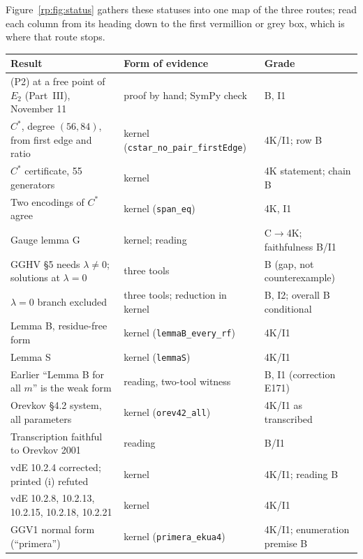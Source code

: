 \documentclass[a4paper,11pt]{article}
\newcommand{\sttag}[3]{{\setlength{\fboxsep}{1.2pt}\colorbox{#1}{\textcolor{#2}{\footnotesize #3}}}}
\newcommand{\stproved}[1]{\sttag{truebg}{truetext}{#1}}
\let\jsOldToprule\toprule
\renewcommand{\toprule}{\jsOldToprule\rowcolor{bgheader}}
\theoremstyle{jsplain}
\theoremstyle{jsdef}
\theoremstyle{jsrem}
\begin{document}
Figure~\ref{rp:fig:status} gathers these statuses into one map of the three routes; read each column from its heading down to the first vermillion or grey box, which is where that route stops.


\begin{center}
\label{rp:tab:status}%
\small
\begin{tabular}{@{}>{\raggedright\arraybackslash}p{5.6cm}>{\raggedright\arraybackslash}p{5.2cm}>{\raggedright\arraybackslash}p{3.2cm}@{}}
\toprule
Result & Form of evidence & Grade\\
\midrule
(P2) at a free point of $E_2$ (Part~III), November 11 & proof by hand; SymPy check & B, I1\\
$C^*$, degree $(56,84)$, from first edge and ratio & kernel (\texttt{cstar\_\allowbreak{}no\_\allowbreak{}pair\_\allowbreak{}firstEdge}) & \stproved{4K/I1}; row B\\
$C^*$ certificate, 55 generators & kernel & 4K statement; chain B\\
Two encodings of $C^*$ agree & kernel (\texttt{span\_\allowbreak{}eq}) & \stproved{4K, I1}\\
Gauge lemma G & kernel; reading & C$\to$4K; faithfulness B/I1\\
GGHV \S5 needs $\lambda\ne0$; solutions at $\lambda=0$ & three tools & B (gap, not counterexample)\\
$\lambda=0$ branch excluded & three tools; reduction in kernel & B, I2; overall B conditional\\
Lemma B, residue-free form & kernel (\texttt{lemmaB\_\allowbreak{}every\_\allowbreak{}rf}) & \stproved{4K/I1}\\
Lemma S & kernel (\texttt{lemmaS}) & \stproved{4K/I1}\\
Earlier ``Lemma B for all $m$'' is the weak form & reading, two-tool witness & B, I1 (correction E171)\\
Orevkov \S4.2 system, all parameters & kernel (\texttt{orev42\_\allowbreak{}all}) & \stproved{4K/I1} as transcribed\\
Transcription faithful to Orevkov 2001 & reading & B/I1\\
vdE 10.2.4 corrected; printed (i) refuted & kernel & \stproved{4K/I1}; reading B\\
vdE 10.2.8, 10.2.13, 10.2.15, 10.2.18, 10.2.21 & kernel & \stproved{4K/I1}\\
GGV1 normal form (``primera'') & kernel (\texttt{primera\_\allowbreak{}ekua4}) & \stproved{4K/I1}; enumeration premise B\\

\end{tabular}
\end{center}
\end{document}
